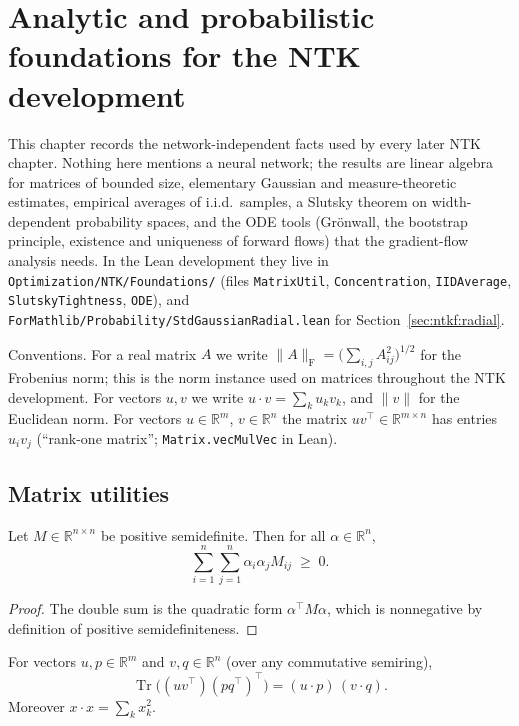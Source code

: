 \chapter{Analytic and probabilistic foundations for the NTK development}\label{chap:ntkf}

This chapter records the network-independent facts used by every later NTK chapter.
Nothing here mentions a neural network; the results are linear algebra for matrices of
bounded size, elementary Gaussian and measure-theoretic estimates, empirical averages of
i.i.d.\ samples, a Slutsky theorem on width-dependent probability spaces, and the ODE tools
(Gr\"onwall, the bootstrap principle, existence and uniqueness of forward flows) that the
gradient-flow analysis needs.
In the Lean development they live in
\texttt{Optimization/NTK/Foundations/} (files \texttt{MatrixUtil}, \texttt{Concentration},
\texttt{IIDAverage}, \texttt{SlutskyTightness}, \texttt{ODE}), and
\texttt{ForMathlib/Probability/StdGaussianRadial.lean} for Section~\ref{sec:ntkf:radial}.

Conventions.
For a real matrix $A$ we write $\|A\|_{\mathrm F}=\bigl(\sum_{i,j}A_{ij}^2\bigr)^{1/2}$ for the
Frobenius norm; this is the norm instance used on matrices throughout the NTK development.
For vectors $u,v$ we write $u\cdot v=\sum_k u_kv_k$, and $\|v\|$ for the Euclidean norm.
For vectors $u\in\mathbb R^m$, $v\in\mathbb R^n$ the matrix $uv^\top\in\mathbb R^{m\times n}$
has entries $u_iv_j$ (``rank-one matrix''; \texttt{Matrix.vecMulVec} in Lean).


\section{Matrix utilities}\label{sec:ntkf:matrix}

\begin{lemma}\label{lem:ntkf:psdSum}
  \leanok
Let $M\in\mathbb R^{n\times n}$ be positive semidefinite. Then for all $\alpha\in\mathbb R^n$,
\[
  \sum_{i=1}^n\sum_{j=1}^n\alpha_i\alpha_jM_{ij}\;\ge\;0 .
\]
\end{lemma}

\begin{proof}
  \leanok
The double sum is the quadratic form $\alpha^\top M\alpha$, which is nonnegative by definition
of positive semidefiniteness.
\end{proof}

\begin{lemma}\label{lem:ntkf:rankOneInner}
  \leanok
For vectors $u,p\in\mathbb R^m$ and $v,q\in\mathbb R^n$ (over any commutative semiring),
\[
  \operatorname{Tr}\bigl((uv^\top)(pq^\top)^\top\bigr)=(u\cdot p)\,(v\cdot q).
\]
Moreover $x\cdot x=\sum_kx_k^2$.
\end{lemma}

